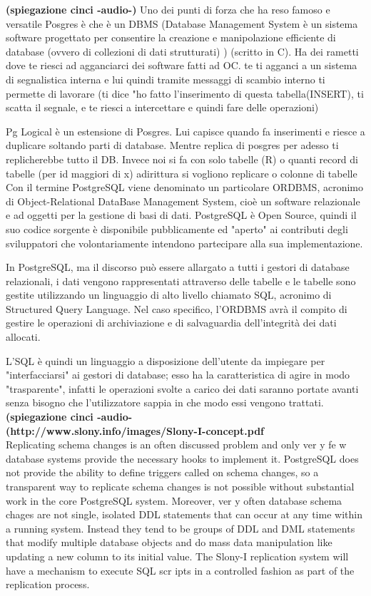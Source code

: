 \textbf{(spiegazione cinci -audio-)}
Uno dei punti di forza che ha reso famoso e versatile Posgres è che è un DBMS (Database Management System è un sistema software progettato per consentire la creazione e manipolazione efficiente di database (ovvero di collezioni di dati strutturati) ) (scritto in C). Ha dei rametti dove te riesci ad agganciarci dei software fatti ad OC. te ti agganci a un sistema di segnalistica interna e lui quindi tramite messaggi di scambio interno ti permette di lavorare (ti dice "ho fatto l'inserimento di questa tabella(INSERT), ti scatta il segnale, e te riesci a intercettare e quindi fare delle operazioni)

Pg Logical è un estensione di Posgres. Lui capisce quando fa inserimenti e riesce a duplicare soltando parti di database. Mentre replica di posgres per adesso ti replicherebbe tutto il DB. Invece noi si fa con solo tabelle (R) o quanti record di tabelle (per id maggiori di x) adirittura si vogliono replicare o colonne di tabelle \\


Con il termine PostgreSQL viene denominato un particolare ORDBMS, acronimo di Object-Relational DataBase Management System, cioè un software relazionale e ad oggetti per la gestione di basi di dati.
PostgreSQL è Open Source, quindi il suo codice sorgente è disponibile pubblicamente ed "aperto" ai contributi degli sviluppatori che volontariamente intendono partecipare alla sua implementazione.

In PostgreSQL, ma il discorso può essere allargato a tutti i gestori di database relazionali, i dati vengono rappresentati attraverso delle tabelle e le tabelle sono gestite utilizzando un linguaggio di alto livello chiamato SQL, acronimo di Structured Query Language.
Nel caso specifico, l'ORDBMS avrà il compito di gestire le operazioni di archiviazione e di salvaguardia dell'integrità dei dati allocati.

L'SQL è quindi un linguaggio a disposizione dell'utente da impiegare per "interfacciarsi" ai gestori di database; esso ha la caratteristica di agire in modo "trasparente", infatti le operazioni svolte a carico dei dati saranno portate avanti senza bisogno che l'utilizzatore sappia in che modo essi vengono trattati.\\
\textbf{(spiegazione cinci -audio-}\\
\textbf{(http://www.slony.info/images/Slony-I-concept.pdf}\\
Replicating schema changes is an often discussed problem and only ver y
fe w database systems provide the necessary hooks to implement it. PostgreSQL
does not provide the ability to define triggers called on schema changes, so a
transparent way to replicate schema changes is not possible without substantial
work in the core PostgreSQL system.
Moreover, ver y often database schema chages are not single, isolated DDL
statements that can occur at any time within a running system. Instead they tend
to be groups of DDL and DML statements that modify multiple database objects
and do mass data manipulation like updating a new column to its initial value.
The Slony-I replication system will have a mechanism to execute SQL
scr ipts in a controlled fashion as part of the replication process.

